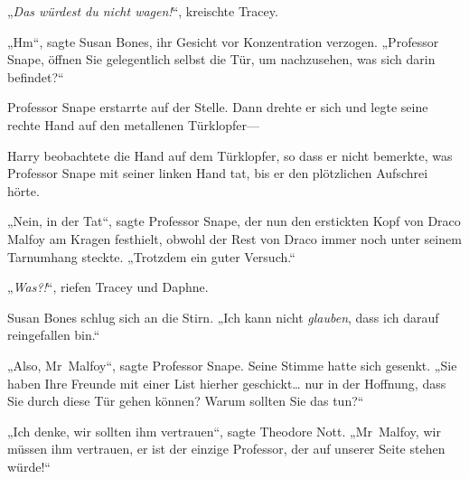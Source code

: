 „\emph{Das würdest du nicht wagen!}“, kreischte Tracey.

„Hm“, sagte Susan Bones, ihr Gesicht vor Konzentration verzogen. „Professor Snape, öffnen Sie gelegentlich selbst die Tür, um nachzusehen, was sich darin befindet?“

Professor Snape erstarrte auf der Stelle. Dann drehte er sich und legte seine rechte Hand auf den metallenen Türklopfer—

Harry beobachtete die Hand auf dem Türklopfer, so dass er nicht bemerkte, was Professor Snape mit seiner linken Hand tat, bis er den plötzlichen Aufschrei hörte.

„Nein, in der Tat“, sagte Professor Snape, der nun den erstickten Kopf von Draco Malfoy am Kragen festhielt, obwohl der Rest von Draco immer noch unter seinem Tarnumhang steckte. „Trotzdem ein guter Versuch.“

„\emph{Was?!}“, riefen Tracey und Daphne.

Susan Bones schlug sich an die Stirn. „Ich kann nicht \emph{glauben}, dass ich darauf reingefallen bin.“

„Also, Mr~Malfoy“, sagte Professor Snape. Seine Stimme hatte sich gesenkt.
„Sie haben Ihre Freunde mit einer List hierher geschickt… nur in der Hoffnung, dass Sie durch diese Tür gehen können? Warum sollten Sie das tun?“

„Ich denke, wir sollten ihm vertrauen“, sagte Theodore Nott. „Mr~Malfoy, wir müssen ihm vertrauen, er ist der einzige Professor, der auf unserer Seite stehen würde!“

